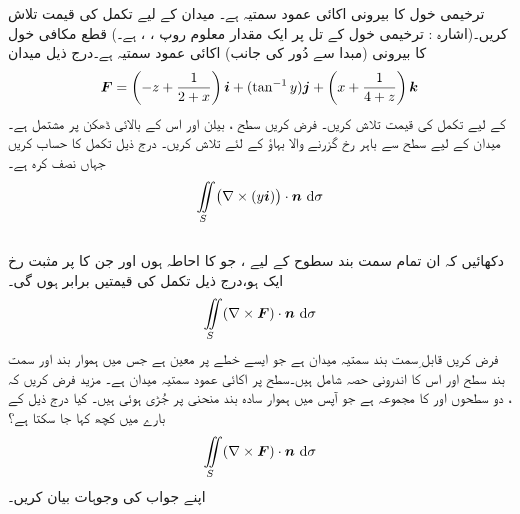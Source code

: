  ترخیمی خول   کا بیرونی اکائی عمود سمتیہ  ہے۔
 میدان کے لیے  تکمل کی قیمت تلاش کریں۔(اشارہ : ترخیمی  خول کے تل پر  ایک مقدار معلوم روپ ، ،  ہے۔)
\wf{\unexpanded{$-6\pi$}}
قطع مکافی  خول   کا بیرونی (مبدا سے دُور کی جانب)  اکائی عمود سمتیہ  ہے۔درج ذیل  میدان
\[{{\boldsymbol{F}}}=\left(-z+\frac{1}{2+x}\right){\boldsymbol{i}}+(\tan^{-1}y){\boldsymbol{j}}+\left(x+\frac{1}{4+z}\right){\boldsymbol{k}}\]
 کے لیے  تکمل   کی قیمت تلاش کریں۔
فرض کریں سطح   ، بیلن     اور اس کے بالائی ڈھکن     پر مشتمل ہے۔میدان  کے لیے سطح  سے باہر رخ  گزرنے والا بہاؤ      کے لئے تلاش کریں۔
 درج ذیل تکمل کا حساب کریں   جہاں   نصف کرہ  ہے۔
\[\iint\limits_S\bigl(\nabla\times(y\ai)\bigr)\cdot\an\,\dif \sigma\]
 \\
دکھائیں کہ  ان تمام سمت بند  سطوح  کے لیے ، جو   کا  احاطہ  ہوں اور جن کا   پر مثبت رخ ایک  ہو،درج ذیل تکمل کی قیمتیں  برابر ہوں  گی۔
\[\iint\limits_S(\nabla\times\kvec{F})\cdot\an\,\dif \sigma\]
 فرض کریں   قابل  ِسمت بند  سمتیہ میدان ہے جو   ایسے خطے پر معین ہے جس میں  ہموار بند  اور سمت بند سطح  اور اس کا اندرونی حصہ شامل ہیں۔سطح   پر اکائی عمود سمتیہ میدان   ہے۔ مزید فرض کریں کہ  ، دو سطحوں  اور  کا مجموعہ ہے جو آپس میں    ہموار سادہ بند منحنی   پر  جُڑی ہوئی ہیں۔ کیا درج ذیل کے بارے میں کچھ کہا جا سکتا ہے؟
\[\iint\limits_S(\nabla\times\kvec{F})\cdot\an\,\dif \sigma\]
اپنے جواب کی وجوہات بیان کریں۔

